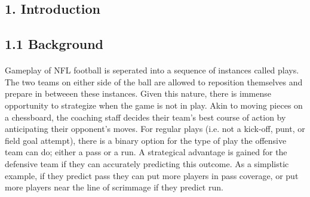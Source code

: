 \documentclass{article}
\begin{document}
    \begin{multicols*}{2}
    
    \section*{1. Introduction}

    \subsection*{1.1 Background}
        
        \paragraph{}
            Gameplay of NFL football is seperated into a sequence of instances called plays. 
            The two teams on either side of the ball are allowed to reposition themselves and prepare in betweeen these instances. 
            Given this nature, there is immense opportunity to strategize when the game is not in play.
            Akin to moving pieces on a chessboard, the coaching staff decides their team's best course of action by anticipating their opponent's moves.  
            For regular plays (i.e. not a kick-off, punt, or field goal attempt), there is a binary option for the type of play the offensive team can do; either a pass or a run.
            A strategical advantage is gained for the defensive team if they can accurately predicting this outcome. 
            As a simplistic example, if they predict pass they can put more players in pass coverage, or put more players near the line of scrimmage if they predict run.
        
        \vspace{-10pt}


\end{multicols*}
\end{document}
